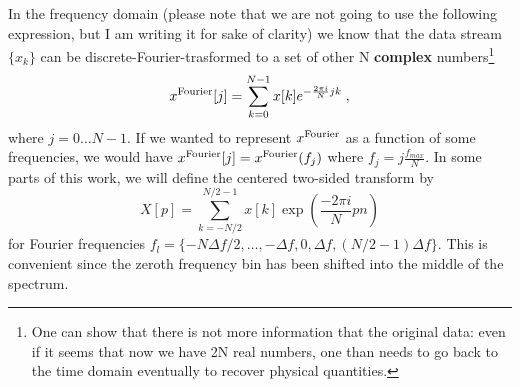 \documentclass{article}
\begin{document}
In the frequency domain (please note that we are not going to use the following expression, but I am writing it for sake of clarity) we know that the data stream $\{x_k\}$ can be discrete-Fourier-trasformed to a set of other N \textbf{complex} numbers\footnote{One can show that there is not more information that the original data: even if it seems that now we have 2N real numbers, one than needs to go back to the time domain eventually to recover physical quantities.}
\begin{align}
x^{\rm Fourier}[j]=\sum_{k=0}^{N-1}x[k] e^{-\frac{2\pi i}{N}jk}\;,
\end{align}
where $j=0\dots N-1$. If we wanted to represent $x^{\rm Fourier}$ as a function of some frequencies, we would have $x^{\rm Fourier}[j]=x^{\rm Fourier}(f_j)$ where $f_j=j\frac{f_{max}}{N}$. In some parts of this work, we will define the centered two-sided transform by 
\begin{equation}
\label{eq:dft-definition}
X[p] = \sum_{k = -N/2}^{N/2 - 1}x[k]\exp(\frac{-2\pi i}{N} p n)
\end{equation}
for Fourier frequencies $f_{l} = \{-N\Delta f/2, \ldots, -\Delta f, 0, \Delta f, (N/2 - 1)\Delta f\}$. This is convenient since the zeroth frequency bin has been shifted into the middle of the spectrum. 
\end{document}
